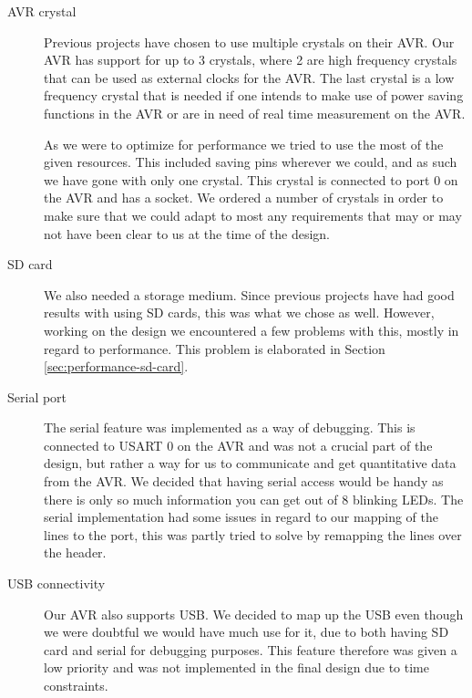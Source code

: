 \begin{description}

\item[AVR crystal] \hfill

Previous projects have chosen to use multiple crystals on their AVR. Our AVR has support for up to 3 crystals, where 2 are high frequency crystals that can be used as external clocks for the AVR. The last crystal is a low frequency crystal that is needed if one intends to make use of power saving functions in the AVR or are in need of real time measurement on the AVR. 

As we were to optimize for performance we tried to use the most of the given resources. This included saving pins wherever we could, and as such we have gone with only one crystal. This crystal is connected to port 0 on the AVR and has a socket. We ordered a number of crystals in order to make sure that we could adapt to most any requirements that may or may not have been clear to us at the time of the design.

\item[SD card]  \hfill %

We also needed a storage medium. Since previous projects have had good results with
using \ac{SD} cards, this was what we chose as well. However, working on the
design we encountered a few problems with this, mostly in
regard to performance. This problem is elaborated in Section
\ref{sec:performance-sd-card}.

\item[Serial port]  \hfill

The serial feature was implemented as a way of debugging. This is connected to
\ac{USART} 0 on the AVR and was not a crucial part of the design, but rather a way for us to communicate and get quantitative data from the AVR. We decided that having serial access would be handy as there is only so much information you can get out of 8 blinking LEDs. The serial implementation had some issues in regard to our mapping of the lines to the port, this was partly tried to solve by remapping the lines over the header.

\item[USB connectivity]  \hfill 

Our AVR also supports \ac{USB}. We decided to map up the \ac{USB} even though we were doubtful we would have much use for it, due to both having \ac{SD} card and serial for debugging purposes. This feature therefore was given a low priority and was not implemented in the final design due to time constraints.
 

\end{description}
